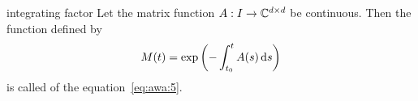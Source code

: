 \begin{Definition}{integrating factor}
    Let the matrix function $A:I\to \mathbb C^{d\times d}$ be continuous.  Then
  the function defined by
  \begin{gather}
    \label{eq:awa:7}
    M(t) = \exp\left(-\int_{t_0}^t A(s) \,\mathrm{d} s\right)
  \end{gather}
  is called  of the
  equation~\eqref{eq:awa:5}.
\end{Definition}
